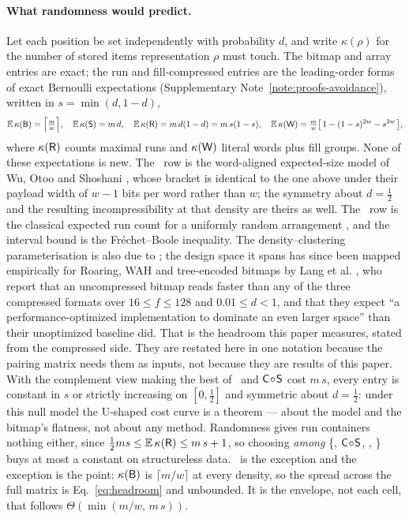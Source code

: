 \paragraph*{What randomness would predict.}
Let each position be set independently with probability $d$, and write $\kappa(\rho)$ for the number
of stored items representation $\rho$ must touch. The bitmap and array entries are exact; the run and
fill-compressed entries are the leading-order forms of exact Bernoulli expectations (Supplementary Note~\ref{note:proofs-avoidance}), written in
$s=\min(d,1-d)$,
\begin{equation}
\mathbb{E}\,\kappa(\textsf{B}) = \Big\lceil \tfrac{m}{w} \Big\rceil, \quad
\mathbb{E}\,\kappa(\textsf{S}) = m\,d, \quad
\mathbb{E}\,\kappa(\textsf{R}) = m\,d(1-d) = m\,s(1-s), \quad
\mathbb{E}\,\kappa(\textsf{W}) = \tfrac{m}{w}\big[\,1-(1-s)^{2w}-s^{2w}\,\big],
\label{eq:expected}
\end{equation}
where $\kappa(\textsf{R})$ counts maximal runs and $\kappa(\textsf{W})$ literal words plus fill groups. None of
these expectations is new. The \rW\ row is the word-aligned expected-size model of Wu, Otoo and
Shoshani \cite{wu2006wah}, whose bracket is identical to the one above under their payload width of
$w-1$ bits per word rather than $w$; the symmetry about $d=\tfrac12$ and the resulting
incompressibility at that density are theirs as well. The \rR\ row is the classical expected run
count for a uniformly random arrangement \cite{mood1940runs}, and the interval bound is
the Fr\'echet--Boole inequality. The density--clustering parameterisation is also due to
\cite{wu2006wah}; the design space it spans has since been mapped empirically for Roaring, WAH and
tree-encoded bitmaps by Lang et al. \cite{lang2020teb}, who report that an uncompressed bitmap reads
faster than any of the three compressed formats over $16 \le f \le 128$ and $0.01 \le d < 1$, and
that they expect ``a performance-optimized implementation to dominate an even larger space'' than
their unoptimized baseline did. That is the headroom this paper measures, stated from the compressed
side. They are restated here in one notation because the pairing matrix needs them as
inputs, not because they are results of this paper. With the
complement view making the best of \rS\ and $\textsf{C}\!\circ\!\textsf{S}$ cost $m\,s$, every entry is constant in
$s$ or strictly increasing on $[0,\tfrac12]$ and symmetric about $d=\tfrac12$: under this null model the
U-shaped cost curve is a theorem --- about the model and the bitmap's flatness, not about any method.
Randomness gives run containers nothing either, since
$\tfrac12 m s\le\mathbb{E}\,\kappa(\textsf{R})\le m\,s+1$, so choosing \emph{among} \{\rS,
$\textsf{C}\!\circ\!\textsf{S}$, \rR, \rW\} buys at most a constant on structureless data. \rB\ is the exception and
the exception is the point: $\kappa(\textsf{B})$ is $\lceil m/w\rceil$ at every density, so the spread across
the full matrix is Eq.~\eqref{eq:headroom} and unbounded. It is the envelope, not each cell, that
follows $\Theta(\min(m/w,\,m\,s))$.

